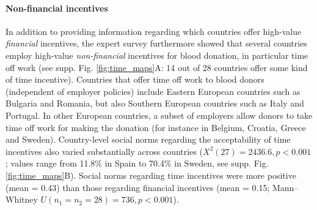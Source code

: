 \documentclass[AER]{AEA}
\begin{document}
\paragraph{Non-financial incentives}

In addition to providing information regarding which countries offer high-value \textit{financial} incentives, the expert survey furthermore showed that several countries employ high-value \textit{non-financial} incentives for blood donation, in particular time off work (see supp. Fig. \ref{fig:time_maps}A: 14 out of 28 countries offer some kind of time incentive). Countries that offer time off work to blood donors (independent of employer policies) include Eastern European countries such as Bulgaria and Romania, but also Southern European countries such as Italy and Portugal. In other European countries, a subset of employers allow donors to take time off work for making the donation (for instance in Belgium, Croatia, Greece and Sweden). Country-level social norms regarding the acceptability of time incentives also varied substantially across countries (${X}^2(27) = 2436.6, p < 0.001$; values range from 11.8\% in Spain to 70.4\% in Sweden, see supp. Fig. \ref{fig:time_maps}B). Social norms regarding time incentives were more positive (mean = 0.43) than those regarding financial incentives (mean = 0.15; Mann–Whitney $U(n_{1} = n_{2} = 28) = 736, p < 0.001$).
\end{document}
